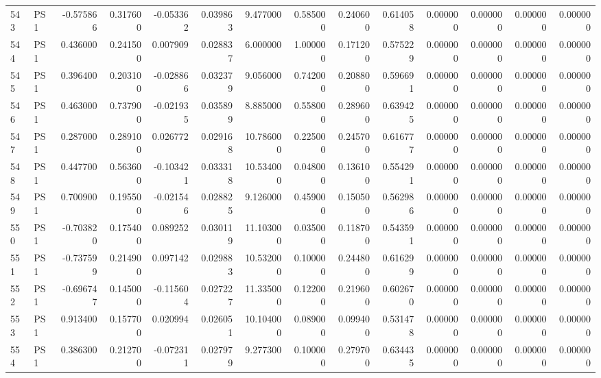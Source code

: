 \begin{tabular}{llrrrrrrrrrrrr}
543 &    PS1 & -0.575866 &      0.317600 & -0.053362 &    0.039863 &   9.477000 &      0.585000 &   0.240600 &  0.614058 &  0.000000 &   0.000000 &     0.000000 &     0.000000 \\
544 &    PS1 &  0.436000 &      0.241500 &  0.007909 &    0.028837 &   6.000000 &      1.000000 &   0.171200 &  0.575229 &  0.000000 &   0.000000 &     0.000000 &     0.000000 \\
545 &    PS1 &  0.396400 &      0.203100 & -0.028866 &    0.032379 &   9.056000 &      0.742000 &   0.208800 &  0.596691 &  0.000000 &   0.000000 &     0.000000 &     0.000000 \\
546 &    PS1 &  0.463000 &      0.737900 & -0.021935 &    0.035899 &   8.885000 &      0.558000 &   0.289600 &  0.639425 &  0.000000 &   0.000000 &     0.000000 &     0.000000 \\
547 &    PS1 &  0.287000 &      0.289100 &  0.026772 &    0.029168 &  10.786000 &      0.225000 &   0.245700 &  0.616777 &  0.000000 &   0.000000 &     0.000000 &     0.000000 \\
548 &    PS1 &  0.447700 &      0.563600 & -0.103421 &    0.033318 &  10.534000 &      0.048000 &   0.136100 &  0.554291 &  0.000000 &   0.000000 &     0.000000 &     0.000000 \\
549 &    PS1 &  0.700900 &      0.195500 & -0.021546 &    0.028825 &   9.126000 &      0.459000 &   0.150500 &  0.562986 &  0.000000 &   0.000000 &     0.000000 &     0.000000 \\
550 &    PS1 & -0.703820 &      0.175400 &  0.089252 &    0.030119 &  11.103000 &      0.035000 &   0.118700 &  0.543591 &  0.000000 &   0.000000 &     0.000000 &     0.000000 \\
551 &    PS1 & -0.737599 &      0.214900 &  0.097142 &    0.029883 &  10.532000 &      0.100000 &   0.244800 &  0.616299 &  0.000000 &   0.000000 &     0.000000 &     0.000000 \\
552 &    PS1 & -0.696747 &      0.145000 & -0.115604 &    0.027227 &  11.335000 &      0.122000 &   0.219600 &  0.602670 &  0.000000 &   0.000000 &     0.000000 &     0.000000 \\
553 &    PS1 &  0.913400 &      0.157700 &  0.020994 &    0.026051 &  10.104000 &      0.089000 &   0.099400 &  0.531478 &  0.000000 &   0.000000 &     0.000000 &     0.000000 \\
554 &    PS1 &  0.386300 &      0.212700 & -0.072311 &    0.027979 &   9.277300 &      0.100000 &   0.279700 &  0.634435 &  0.000000 &   0.000000 &     0.000000 &     0.000000 \\

\end{tabular}
